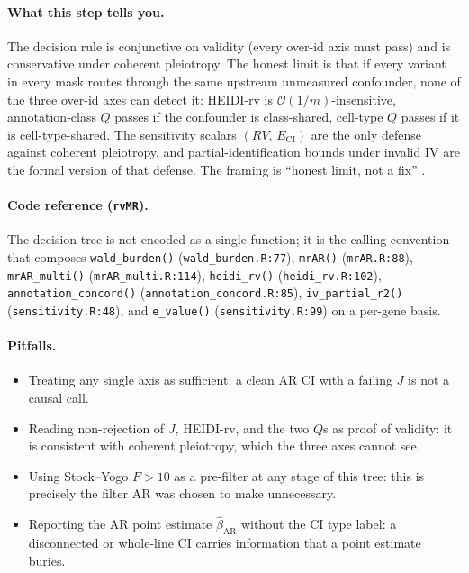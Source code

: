 \documentclass[11pt]{article}
\begin{document}
\paragraph{What this step tells you.} The decision rule is conjunctive on validity (every over-id axis must pass) and is conservative under coherent pleiotropy. The honest limit is that if every variant in every mask routes through the same upstream unmeasured confounder, none of the three over-id axes can detect it: HEIDI-rv is $\mathcal{O}(1/m)$-insensitive, annotation-class $Q$ passes if the confounder is class-shared, cell-type $Q$ passes if it is cell-type-shared. The sensitivity scalars $(RV,\,E_{\mathrm{CI}})$ are the only defense against coherent pleiotropy, and partial-identification bounds under invalid IV \citep{WangTchetgen2018} are the formal version of that defense. The framing is ``honest limit, not a fix'' \citep{CinelliHazlett2025}.

\paragraph{Code reference (\texttt{rvMR}).} The decision tree is not encoded as a single function; it is the calling convention that composes \verb|wald_burden()| (\verb|wald_burden.R:77|), \verb|mrAR()| (\verb|mrAR.R:88|), \verb|mrAR_multi()| (\verb|mrAR_multi.R:114|), \verb|heidi_rv()| (\verb|heidi_rv.R:102|), \verb|annotation_concord()| (\verb|annotation_concord.R:85|), \verb|iv_partial_r2()| (\verb|sensitivity.R:48|), and \verb|e_value()| (\verb|sensitivity.R:99|) on a per-gene basis.

\paragraph{Pitfalls.}
\begin{itemize}
\item Treating any single axis as sufficient: a clean AR CI with a failing $J$ is not a causal call.
\item Reading non-rejection of $J$, HEIDI-rv, and the two $Q$s as proof of validity: it is consistent with coherent pleiotropy, which the three axes cannot see.
\item Using Stock--Yogo $F>10$ as a pre-filter at any stage of this tree: this is precisely the filter AR was chosen to make unnecessary.
\item Reporting the AR point estimate $\hat\beta_{\mathrm{AR}}$ without the CI type label: a disconnected or whole-line CI carries information that a point estimate buries.
\end{itemize}
\end{document}
